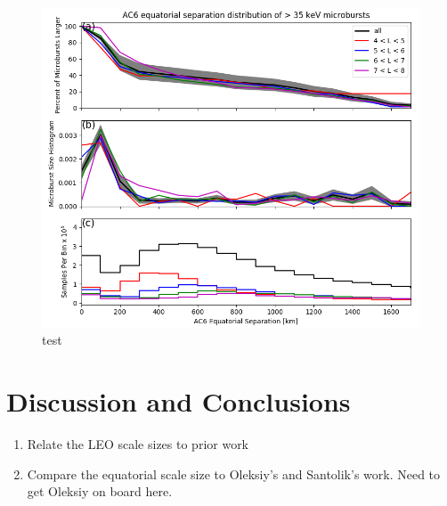 \documentclass[draft]{agujournal2019}
\begin{document}
\begin{figure}
\includegraphics[width=\textwidth]{fig4.png}
\caption{test} \label{fig4}
\end{figure}

\section{Discussion and Conclusions}
\begin{enumerate}
\item Relate the LEO scale sizes to prior work
\item Compare the equatorial scale size to Oleksiy’s and Santolik’s work. Need to get Oleksiy on board here.
\end{enumerate}







\end{document}
